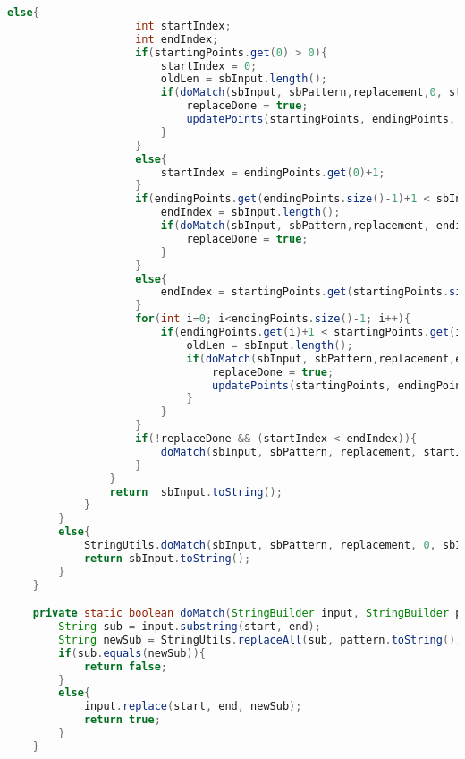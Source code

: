 \documentclass{article}
\begin{document}
\begin{lstlisting}[language=Java]
                else{
                    int startIndex;
                    int endIndex;
                    if(startingPoints.get(0) > 0){
                        startIndex = 0;
                        oldLen = sbInput.length();
                        if(doMatch(sbInput, sbPattern,replacement,0, startingPoints.get(0))) {
                            replaceDone = true;
                            updatePoints(startingPoints, endingPoints, 0, sbInput.length() - oldLen);
                        }
                    }
                    else{
                        startIndex = endingPoints.get(0)+1;
                    }
                    if(endingPoints.get(endingPoints.size()-1)+1 < sbInput.length()){
                        endIndex = sbInput.length();
                        if(doMatch(sbInput, sbPattern,replacement, endingPoints.get(endingPoints.size()-1)+1, sbInput.length())) {
                            replaceDone = true;
                        }
                    }
                    else{
                        endIndex = startingPoints.get(startingPoints.size()-1) -1 ;
                    }
                    for(int i=0; i<endingPoints.size()-1; i++){
                        if(endingPoints.get(i)+1 < startingPoints.get(i+1)){
                            oldLen = sbInput.length();
                            if(doMatch(sbInput, sbPattern,replacement,endingPoints.get(i)+1, startingPoints.get(i+1))){
                                replaceDone = true;
                                updatePoints(startingPoints, endingPoints, endingPoints.get(i), sbInput.length() - oldLen);
                            }
                        }
                    }
                    if(!replaceDone && (startIndex < endIndex)){
                        doMatch(sbInput, sbPattern, replacement, startIndex, endIndex);
                    }
                }
                return  sbInput.toString();
            }
        }
        else{
            StringUtils.doMatch(sbInput, sbPattern, replacement, 0, sbInput.length());
            return sbInput.toString();
        }
    }

    private static boolean doMatch(StringBuilder input, StringBuilder pattern, String replace, Integer start, Integer end){
        String sub = input.substring(start, end);
        String newSub = StringUtils.replaceAll(sub, pattern.toString(), replace);
        if(sub.equals(newSub)){
            return false;
        }
        else{
            input.replace(start, end, newSub);
            return true;
        }
    }


\end{lstlisting}
\end{document}
